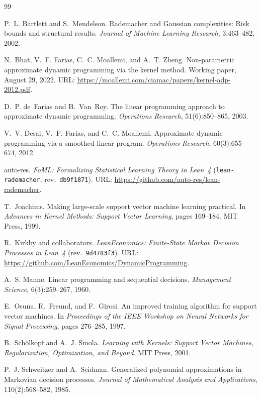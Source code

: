 \documentclass[11pt,letterpaper]{article}
\theoremstyle{definition}
\begin{document}
\begin{thebibliography}{99}

P.~L. Bartlett and S.~Mendelson.
\newblock Rademacher and Gaussian complexities: Risk bounds and structural results.
\newblock \emph{Journal of Machine Learning Research}, 3:463--482, 2002.

N.~Bhat, V.~F. Farias, C.~C. Moallemi, and A.~T. Zheng.
\newblock Non-parametric approximate dynamic programming via the kernel method.
\newblock Working paper, August 29, 2022. URL: \url{https://moallemi.com/ciamac/papers/kernel-adp-2012.pdf}.

D.~P. de~Farias and B.~Van~Roy.
\newblock The linear programming approach to approximate dynamic programming.
\newblock \emph{Operations Research}, 51(6):850--865, 2003.

V.~V. Desai, V.~F. Farias, and C.~C. Moallemi.
\newblock Approximate dynamic programming via a smoothed linear program.
\newblock \emph{Operations Research}, 60(3):655--674, 2012.

auto-res.
\newblock \emph{FoML: Formalizing Statistical Learning Theory in Lean~4} (\nolinkurl{lean-rademacher}, rev.~\nolinkurl{db9f1871}).
\newblock URL: \url{https://github.com/auto-res/lean-rademacher}.

T.~Joachims.
\newblock Making large-scale support vector machine learning practical.
\newblock In \emph{Advances in Kernel Methods: Support Vector Learning}, pages 169--184. MIT Press, 1999.

R.~Kirkby and collaborators.
\newblock \emph{LeanEconomics: Finite-State Markov Decision Processes in Lean~4} (rev.~\nolinkurl{9d4783f3}).
\newblock URL: \url{https://github.com/LeanEconomics/DynamicProgramming}.

A.~S. Manne.
\newblock Linear programming and sequential decisions.
\newblock \emph{Management Science}, 6(3):259--267, 1960.

E.~Osuna, R.~Freund, and F.~Girosi.
\newblock An improved training algorithm for support vector machines.
\newblock In \emph{Proceedings of the IEEE Workshop on Neural Networks for Signal Processing}, pages 276--285, 1997.

B.~Sch{\"o}lkopf and A.~J. Smola.
\newblock \emph{Learning with Kernels: Support Vector Machines, Regularization, Optimization, and Beyond}.
\newblock MIT Press, 2001.

P.~J. Schweitzer and A.~Seidman.
\newblock Generalized polynomial approximations in Markovian decision processes.
\newblock \emph{Journal of Mathematical Analysis and Applications}, 110(2):568--582, 1985.

\end{thebibliography}
\end{document}
